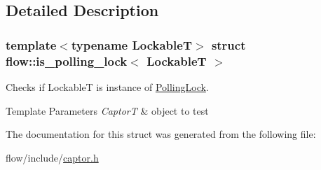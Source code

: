\subsection{Detailed Description}
\subsubsection*{template$<$typename LockableT$>$\newline
struct flow\+::is\+\_\+polling\+\_\+lock$<$ Lockable\+T $>$}

Checks if {\ttfamily LockableT} is instance of \hyperlink{structflow_1_1_polling_lock}{Polling\+Lock}. 


\begin{DoxyTemplParams}{Template Parameters}
{\em CaptorT} & object to test \\
\hline
\end{DoxyTemplParams}


The documentation for this struct was generated from the following file\+:\begin{DoxyCompactItemize}
\item 
flow/include/\hyperlink{captor_8h}{captor.\+h}\end{DoxyCompactItemize}
